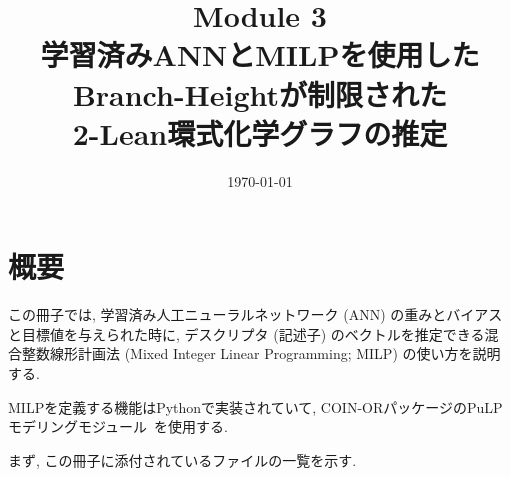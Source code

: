 \documentclass[11pt, titlepage, dvipdfmx, twoside]{jarticle}
\title{\Huge{Module 3\\ 学習済みANNとMILPを使用したBranch-Heightが制限された\\ 2-Lean環式化学グラフの推定}}
\newcommand{\target}{目標}
\begin{document}
\makeatletter 
\let\c@lstlisting\c@figure
\makeatother


\date{\today}

\maketitle


\thispagestyle{empty}
\tableofcontents
\clearpage



\section{概要}
\label{sec:Intro}

この冊子では, 学習済み人工ニューラルネットワーク (ANN) の重みとバイアスと\target 値を与えられた時に, 
デスクリプタ (記述子) のベクトルを推定できる混合整数線形計画法 (Mixed Integer Linear Programming; MILP) の使い方を説明する. 

MILPを定義する機能はPythonで実装されていて, 
COIN-ORパッケージのPuLPモデリングモジュール~\cite{PuLP1,PuLP2,PuLP3,PuLP4}を使用する. 

まず, この冊子に添付されているファイルの一覧を示す. 
\end{document}
